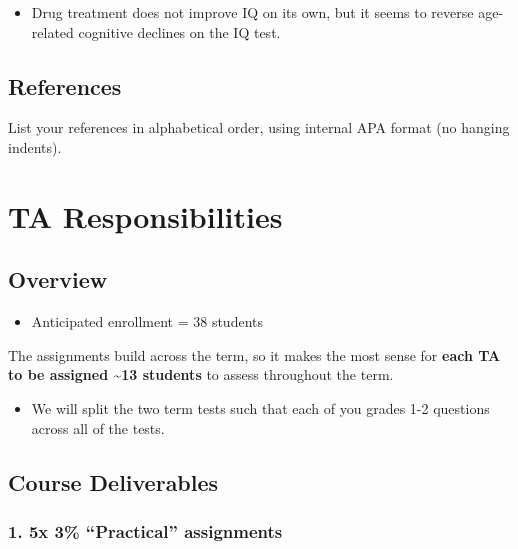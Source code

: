 \documentclass[
]{book}
\providecommand{\tightlist}{%
  \setlength{\itemsep}{0pt}\setlength{\parskip}{0pt}}
\begin{document}
\begin{itemize}
\tightlist
\item
  Drug treatment does not improve IQ on its own, but it seems to reverse age-related cognitive declines on the IQ test.
\end{itemize}

\section*{References}\label{references}

List your references in alphabetical order, using internal APA format (no hanging indents).

\chapter*{TA Responsibilities}\label{ta-responsibilities}

\section*{Overview}\label{overview-2}

\begin{itemize}
\tightlist
\item
  Anticipated enrollment = 38 students
\end{itemize}

The assignments build across the term, so it makes the most sense for \textbf{each TA to be assigned \textasciitilde13 students} to assess throughout the term.

\begin{itemize}
\tightlist
\item
  We will split the two term tests such that each of you grades 1-2 questions across all of the tests.
\end{itemize}

\section*{Course Deliverables}\label{course-deliverables}

\subsection*{1. 5x 3\% ``Practical'' assignments}\label{x-3-practical-assignments}
\end{document}
